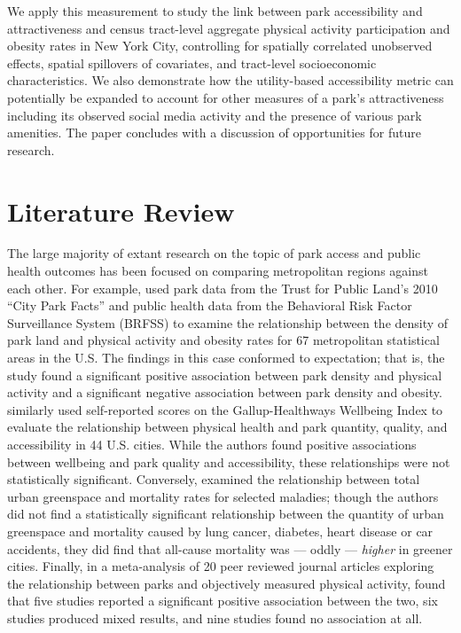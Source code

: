 \documentclass[Afour,sageh.bst]{sagej}
\begin{document}
We apply this measurement to study the link between park accessibility
and attractiveness and census tract-level aggregate physical activity
participation and obesity rates in New York City, controlling for
spatially correlated unobserved effects, spatial spillovers of
covariates, and tract-level socioeconomic characteristics. We also
demonstrate how the utility-based accessibility metric can potentially
be expanded to account for other measures of a park's attractiveness
including its observed social media activity and the presence of various
park amenities. The paper concludes with a discussion of opportunities
for future research.

\hypertarget{literature-review}{%
\section{Literature Review}\label{literature-review}}

\label{sec:litreview}

The large majority of extant research on the topic of park access and
public health outcomes has been focused on comparing metropolitan
regions against each other. For example, \citet{West2012} used park data
from the Trust for Public Land's 2010 ``City Park Facts'' and public
health data from the Behavioral Risk Factor Surveillance System (BRFSS)
to examine the relationship between the density of park land and
physical activity and obesity rates for 67 metropolitan statistical
areas in the U.S. The findings in this case conformed to expectation;
that is, the study found a significant positive association between park
density and physical activity and a significant negative association
between park density and obesity. \citet{Larson2016} similarly used
self-reported scores on the Gallup-Healthways Wellbeing Index to
evaluate the relationship between physical health and park quantity,
quality, and accessibility in 44 U.S. cities. While the authors found
positive associations between wellbeing and park quality and
accessibility, these relationships were not statistically significant.
Conversely, \citet{Richardson2012} examined the relationship between
total urban greenspace and mortality rates for selected maladies; though
the authors did not find a statistically significant relationship
between the quantity of urban greenspace and mortality caused by lung
cancer, diabetes, heart disease or car accidents, they did find that
all-cause mortality was --- oddly --- \emph{higher} in greener cities.
Finally, in a meta-analysis of 20 peer reviewed journal articles
exploring the relationship between parks and objectively measured
physical activity, \citet{Bancroft2015} found that five studies reported
a significant positive association between the two, six studies produced
mixed results, and nine studies found no association at all.
\end{document}
